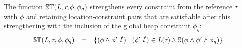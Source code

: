 \begin{definition}
\label{def:ST}
The function $\mathbb{ST}(\emph{L},\emph{r},\phi,\phi_g)$
strengthens every constraint from the reference $\emph{r}$ with
$\phi$ and retaining location-constraint pairs that are satisfiable
after this strengthening with the inclusion of the global heap
constraint $\phi_g$:
\[
\begin{array}{rcl} 
\mathbb{ST}(\cfgnt{L},\cfgnt{r},\phi,\phi_g) & = & \{ (\phi\wedge\phi^\prime\ \cfgnt{l}^\prime) \mid (\phi^\prime\ \cfgnt{l}^\prime)\in \cfgnt{L}(\cfgnt{r})\wedge\mathbb{S}(\phi\wedge\phi^\prime\wedge\phi_g) \}
\end{array}
\]
\end{definition}

